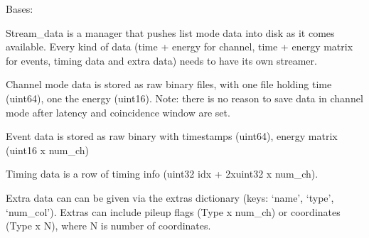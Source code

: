 \documentclass[letterpaper,10pt,english]{sphinxmanual}
\begin{document}

\begin{fulllineitems}
\label{\detokenize{autodocs/data:listmode.data.StreamData}}
\sphinxAtStartPar
Bases: 

\sphinxAtStartPar
Stream\_data is a manager that pushes list mode data into disk as it comes available. Every kind
of data (time + energy for channel, time + energy matrix for events, timing data and extra data) needs to have its
own streamer.

\sphinxAtStartPar
Channel mode data is stored as raw binary files, with one file holding time (uint64), one the energy (uint16).
Note: there is no reason to save data in channel mode after latency and coincidence window are set.

\sphinxAtStartPar
Event data is stored as raw binary with timestamps (uint64), energy matrix (uint16 x num\_ch)

\sphinxAtStartPar
Timing data is a row of timing info (uint32 idx + 2xuint32 x num\_ch).

\sphinxAtStartPar
Extra data can can be given via the extras dictionary (keys: ‘name’, ‘type’, ‘num\_col’). Extras can include pile\sphinxhyphen{}up
flags (Type x num\_ch) or coordinates (Type x N), where N is number of coordinates.

\begin{fulllineitems}
\label{\detokenize{autodocs/data:listmode.data.StreamData.close}}
\end{fulllineitems}


\begin{fulllineitems}
\label{\detokenize{autodocs/data:listmode.data.StreamData.new_files}}
\end{fulllineitems}


\end{fulllineitems}
\end{document}
